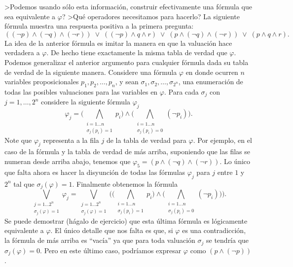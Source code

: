 >Podemos usando s\'olo esta informaci\'on, construir efectivamente una f\'ormula que sea equivalente a $\varphi$?
>Qu\'e operadores necesitamos para hacerlo?
La siguiente f\'ormula muestra una respuesta positiva a la primera pregunta:
\[
((\neg p) \wedge (\neg q) \wedge (\neg r))\; \vee\; 
((\neg p) \wedge q \wedge r)\; \vee\;
(p \wedge (\neg q) \wedge (\neg r))\; \vee\;
(p \wedge q \wedge r).
\]
La idea de la anterior f\'ormula es imitar la manera en que la valuaci\'on hace verdadera a $\varphi$.
De hecho tiene exactamente la misma tabla de verdad que $\varphi$. 
Podemos generalizar el anterior argumento para cualquier f\'ormula dada su tabla de verdad de la
siguiente manera.
Considere una f\'ormula $\varphi$ en donde ocurren $n$ variables proposicionales $p_1,p_2,\ldots,p_n$, y sean
$\sigma_1,\sigma_2,\ldots,\sigma_{2^n}$, una enumeraci\'on de todas las posibles valuaciones
para las variables en $\varphi$.
Para cada $\sigma_j$ con $j=1,\ldots,2^n$ %
considere la siguiente f\'ormula $\varphi_j$
\[
\varphi_j=\big(\underset{\substack{i=1\ldots n\\ \sigma_j(p_i)=1}}{\bigwedge}p_i\big) 
\wedge \big( \underset{\substack{i=1\ldots n\\ \sigma_j(p_i)=0}}{\bigwedge}(\neg p_i) \big).
\]
Note que $\varphi_j$ representa a la fila $j$ de la tabla de verdad para $\varphi$.
Por ejemplo, en el caso de la f\'ormula y la tabla de verdad de m\'as arriba, suponiendo que las 
filas se numeran desde arriba abajo, tenemos que 
$\varphi_5=(p \wedge (\neg q) \wedge (\neg r))$.
Lo \'unico que falta ahora es hacer la disyunci\'on de todas las f\'ormulas $\varphi_j$ para $j$ entre $1$ y $2^n$
tal que $\sigma_j(\varphi)=1$. Finalmente obtenemos la f\'ormula
\[
\bigvee_{\substack{j=1\ldots 2^n\\ \sigma_j(\varphi)=1}}\varphi_j = 
\bigvee_{\substack{j=1\ldots 2^n\\ \sigma_j(\varphi)=1}}\bigg( 
\big(\underset{\substack{i=1\ldots n\\ \sigma_j(p_i)=1}}{\bigwedge}p_i\big) 
\wedge \big( \underset{\substack{i=1\ldots n\\ \sigma_j(p_i)=0}}{\bigwedge}(\neg p_i) \big) \bigg).
\]
Se puede demostrar (h\'agalo de ejercicio) que esta \'ultima f\'ormula es l\'ogicamente equivalente
a $\varphi$.
El \'unico detalle que nos falta es que, si $\varphi$ es una contradicci\'on, la f\'ormula de m\'as arriba
es ``vac\'{i}a'' ya que para toda valuaci\'on $\sigma_j$ se tendr\'{i}a que $\sigma_j(\varphi)=0$.
Pero en este \'ultimo caso, podr\'{i}amos expresar $\varphi$ como $(p\wedge (\neg p))$.

